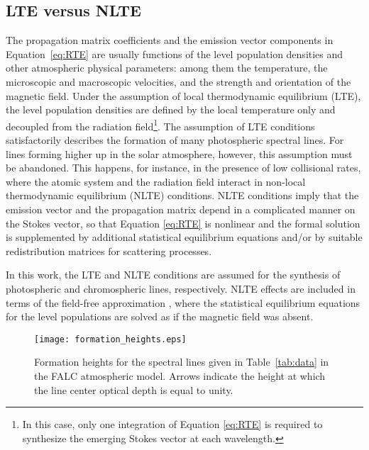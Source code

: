 \documentclass[iop,numberedappendix,twocolappendix,twocolumn]{emulateapj}
\begin{document}
\subsection{LTE versus NLTE}\label{subsec:4.1}
%
The propagation matrix coefficients and the emission vector components in Equation~\eqref{eq:RTE}
are usually functions of the level population densities and other atmospheric physical parameters:
among them the temperature, the microscopic and macroscopic velocities, and the strength and orientation of the magnetic field. Under the assumption of local thermodynamic equilibrium (LTE), the level population densities are defined by the local temperature only and decoupled from the radiation field\footnote{In this case, only one integration of Equation \eqref{eq:RTE} is required to synthesize the emerging Stokes vector at each wavelength.}.
The assumption of LTE conditions satisfactorily describes the formation of many photospheric spectral lines. For lines forming higher up in the solar atmosphere, however, this assumption must be abandoned. This happens, for instance, in the presence of low collisional rates, where the atomic system and the radiation field interact in non-local thermodynamic equilibrium (NLTE) conditions. NLTE conditions imply that the emission vector and the propagation matrix depend in a complicated manner on the Stokes vector, so that Equation \eqref{eq:RTE} is nonlinear and the formal solution is supplemented by additional statistical equilibrium equations and/or by suitable redistribution matrices for scattering processes.

In this work, the LTE and NLTE conditions are assumed for the synthesis of photospheric and chromospheric lines, respectively.
NLTE effects are included in terms of the field-free approximation \citep{rees1969},
where the statistical equilibrium
equations for the level populations are solved as if the magnetic field was absent.
%
%
\begin{figure}
\centering
\texttt{[image: formation\_heights.eps]}  
\caption{Formation heights for the spectral lines given in Table~\ref{tab:data} in the FALC atmospheric model.
Arrows indicate the height at which the line center optical depth is equal to unity.}
\label{fig:formation_heights}
\end{figure}
%
\end{document}
